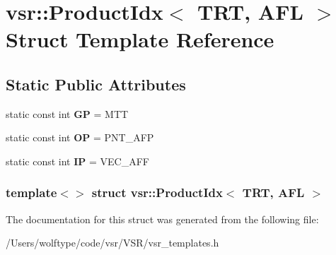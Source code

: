\hypertarget{structvsr_1_1_product_idx_3_01_t_r_t_00_01_a_f_l_01_4}{\section{vsr\-:\-:Product\-Idx$<$ T\-R\-T, A\-F\-L $>$ Struct Template Reference}
\label{structvsr_1_1_product_idx_3_01_t_r_t_00_01_a_f_l_01_4}
}
\subsection*{Static Public Attributes}
\begin{DoxyCompactItemize}
\item 
\hypertarget{structvsr_1_1_product_idx_3_01_t_r_t_00_01_a_f_l_01_4_abffced21f09beecc498a145e04792c40}{static const int {\bfseries G\-P} = M\-T\-T}\label{structvsr_1_1_product_idx_3_01_t_r_t_00_01_a_f_l_01_4_abffced21f09beecc498a145e04792c40}

\item 
\hypertarget{structvsr_1_1_product_idx_3_01_t_r_t_00_01_a_f_l_01_4_a3c9e04675f6033a1cd9e988f42253708}{static const int {\bfseries O\-P} = P\-N\-T\-\_\-\-A\-F\-P}\label{structvsr_1_1_product_idx_3_01_t_r_t_00_01_a_f_l_01_4_a3c9e04675f6033a1cd9e988f42253708}

\item 
\hypertarget{structvsr_1_1_product_idx_3_01_t_r_t_00_01_a_f_l_01_4_af990d5c13006a518741854fcbea72715}{static const int {\bfseries I\-P} = V\-E\-C\-\_\-\-A\-F\-F}\label{structvsr_1_1_product_idx_3_01_t_r_t_00_01_a_f_l_01_4_af990d5c13006a518741854fcbea72715}

\end{DoxyCompactItemize}
\subsubsection*{template$<$$>$ struct vsr\-::\-Product\-Idx$<$ T\-R\-T, A\-F\-L $>$}



The documentation for this struct was generated from the following file\-:\begin{DoxyCompactItemize}
\item 
/\-Users/wolftype/code/vsr/\-V\-S\-R/vsr\-\_\-templates.\-h\end{DoxyCompactItemize}
